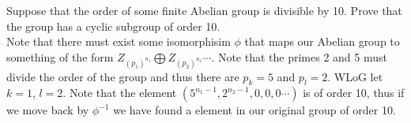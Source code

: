 \documentclass[12pt]{article}
\makeatletter
\theoremstyle{homework}
\newenvironment{exercise}[1]
{\def\@currentlabel{#1}\exercisecore}
{\endexercisecore}
\makeatother
\begin{document}
\begin{exercise}{11.12}
Suppose that the order of some finite Abelian group is divisible by 10. Prove that the group has a cyclic subgroup of order 10.\\
Note that there must exist some isomorphisim $\phi$ that maps our Abelian group to something of the form $Z_{(p_1)^{n_1}}\bigoplus Z_{(p_2)^{n_2}}\cdots$.  Note that the primes 2 and 5 must divide the order of the group and thus there are $p_k=5$ and $p_l=2$.  WLoG let $k=1$, $l=2$.  Note that the element $(5^{n_1-1},2^{n_2-1},0,0,0\cdots )$ is of order 10, thus if we move back by $\phi^{-1}$ we have found a element in our original group of order 10.
\end{exercise}
\end{document}
